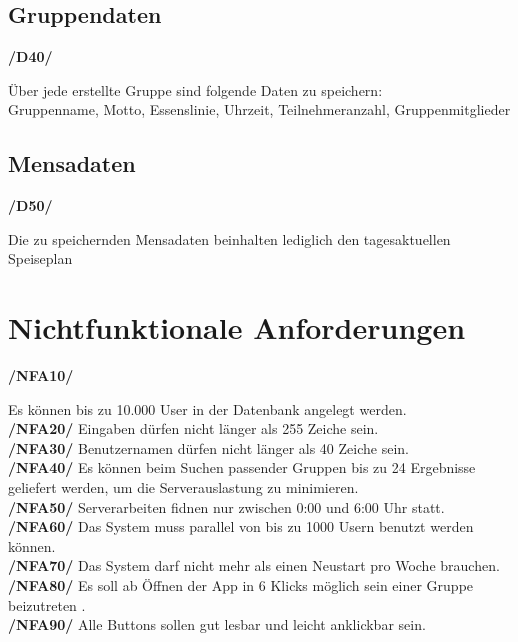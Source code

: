 \documentclass[a4paper]{scrreprt}
\begin{document}
\section{Gruppendaten}

\begin{addmargin}[25pt]{0pt}
\hypertarget{d40}{\textbf{/D40/}} Über jede erstellte Gruppe sind folgende Daten zu speichern:\\
Gruppenname, Motto, Essenslinie, Uhrzeit, Teilnehmeranzahl, Gruppenmitglieder\\
\end{addmargin}

\section{Mensadaten}

\begin{addmargin}[25pt]{0pt}
\hypertarget{d50}{\textbf{/D50/}} Die zu speichernden Mensadaten beinhalten lediglich den tagesaktuellen Speiseplan\\
\end{addmargin}



\chapter{Nichtfunktionale Anforderungen}

\begin{addmargin}[25pt]{0pt} 

\hypertarget{nfa10}{\textbf{/NFA10/}} Es können bis zu 10.000 User in der Datenbank angelegt werden.\\
\hypertarget{nfa20}{\textbf{/NFA20/}} Eingaben dürfen nicht länger als 255 Zeiche sein.\\
\hypertarget{nfa30}{\textbf{/NFA30/}} Benutzernamen dürfen nicht länger als 40 Zeiche sein.\\
\hypertarget{nfa40}{\textbf{/NFA40/}} Es können beim Suchen passender Gruppen bis zu 24 Ergebnisse geliefert werden, um die Serverauslastung zu minimieren.\\
\hypertarget{nfa50}{\textbf{/NFA50/}} Serverarbeiten fidnen nur zwischen 0:00 und 6:00 Uhr statt.\\
\hypertarget{nfa60}{\textbf{/NFA60/}} Das System muss parallel von bis zu 1000 Usern benutzt werden können.\\
\hypertarget{nfa70}{\textbf{/NFA70/}} Das System darf nicht mehr als einen Neustart pro Woche brauchen.\\
\hypertarget{nfa80}{\textbf{/NFA80/}} Es soll ab Öffnen der App in 6 Klicks möglich sein einer Gruppe beizutreten .\\
\hypertarget{nfa90}{\textbf{/NFA90/}} Alle Buttons sollen gut lesbar und leicht anklickbar sein.\\

\end{addmargin}
\end{document}
